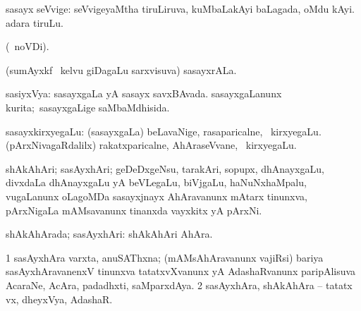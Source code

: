 \bentry
{}
\gl{\nA}
\expl{}
\bmng
\emng
\eentry

\bentry
{}
\gl{\nA}
\expl{}
\bmng
 sasayx seVvige: 
\banum
{} seVvigeyaMtha tiruLiruva, kuMbaLakAyi baLagada, oMdu kAyi. 
 adara tiruLu. 
\eanum
\emng
\eentry

\bentry
{}
\gl{\nA}
\bmng
{} 
\emng
\eentry

\bentry
{}
\gl{\nA}
\expl{}
\bmng
{} (\pagu\ noVDi). 
\emng
\eentry

\bentry
{}
\gl{\nA}
\expl{}
\bmng
 (sumAyxkf \mo\ kelvu giDagaLu sarxvisuva) sasayxrALa. 
\emng
\eentry

\bentry
{}
\gl{\gu}
\expl{}
\bmng
 sasiyxVya: 
\banum
{} sasayxgaLa yA sasayx savxBAvada. 
 sasayxgaLanunx kurita;~sasayxgaLige saMbaMdhisida. 
\eanum
\emng

\noindent 
\gl{\pagu}
\expl{}
\bmng
  sasayxkirxyegaLu: 
\banum
{} (sasayxgaLa) beLavaNige, rasaparicalne, \mo\ kirxyegaLu. 
 (pArxNivagaRdalilx) rakatxparicalne, AhAraseVvane, \mo\ kirxyegaLu. 
\eanum
\emng
\eentry

\bentry
{} 
\gl{\nA}
\expl{}
\bmng
shAkAhAri; sasAyxhAri; geDeDxgeNsu, tarakAri, sopupx, dhAnayxgaLu, divxdaLa dhAnayxgaLu yA beVLegaLu, biVjgaLu, haNuNxhaMpalu, \mo vugaLanunx oLagoMDa sasayxjnayx AhAravanunx mAtarx tinunxva, pArxNigaLa mAMsavanunx tinanxda vayxkitx yA pArxNi. 
\emng
\eentry

\bentry
{} 
\gl{\gu}
\expl{}
\bmng
 shAkAhArada; sasAyxhAri:  shAkAhAri AhAra. 
\emng
\eentry

\bentry
{} 
\gl{\nA}
\expl{}
\bmng
\bnum
\num{1} sasAyxhAra varxta, anuSAThxna; (mAMsAhAravanunx vajiRsi) bariya sasAyxhAravanenxV tinunxva tatatxvXvanunx yA AdashaRvanunx paripAlisuva AcaraNe, AcAra, padadhxti, saMparxdAya. 
\num{2} sasAyxhAra, shAkAhAra -- tatatx vx, dheyxVya, AdashaR. 
\enum
\emng
\eentry

